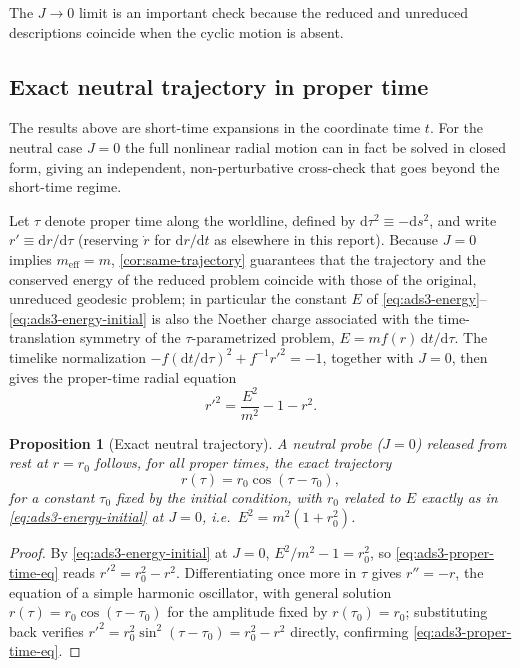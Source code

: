 \documentclass[11pt,a4paper]{article}
\theoremstyle{plain}
\newtheorem{proposition}{Proposition}[section]
\theoremstyle{definition}
\theoremstyle{remark}
\newcommand{\meff}{m_{\mathrm{eff}}}
\begin{document}
The $J\to0$ limit is an important check because the reduced and unreduced descriptions coincide when the cyclic motion is absent.

\subsection{Exact neutral trajectory in proper time}
\label{sec:ads3-exact-neutral}

The results above are short-time expansions in the coordinate time $t$. For the neutral case $J=0$ the full nonlinear radial motion can in fact be solved in closed form, giving an independent, non-perturbative cross-check that goes beyond the short-time regime.

Let $\tau$ denote proper time along the worldline, defined by $\mathrm d\tau^2\equiv-\mathrm ds^2$, and write $r'\equiv\mathrm dr/\mathrm d\tau$ (reserving $\dot r$ for $\mathrm dr/\mathrm dt$ as elsewhere in this report). Because $J=0$ implies $\meff=m$, \cref{cor:same-trajectory} guarantees that the trajectory and the conserved energy of the reduced problem coincide with those of the original, unreduced geodesic problem; in particular the constant $E$ of \eqref{eq:ads3-energy}--\eqref{eq:ads3-energy-initial} is also the Noether charge associated with the time-translation symmetry of the $\tau$-parametrized problem, $E=mf(r)\,\mathrm dt/\mathrm d\tau$. The timelike normalization $-f(\mathrm dt/\mathrm d\tau)^2+f^{-1}r'^2=-1$, together with $J=0$, then gives the proper-time radial equation
\begin{equation}
r'^2=\frac{E^2}{m^2}-1-r^2.
\label{eq:ads3-proper-time-eq}
\end{equation}

\begin{proposition}[Exact neutral trajectory]
\label{prop:ads3-exact-neutral}
A neutral probe ($J=0$) released from rest at $r=r_0$ follows, for all proper times, the exact trajectory
\begin{equation}
\boxed{
r(\tau)=r_0\cos(\tau-\tau_0),
}
\label{eq:ads3-exact-neutral}
\end{equation}
for a constant $\tau_0$ fixed by the initial condition, with $r_0$ related to $E$ exactly as in \eqref{eq:ads3-energy-initial} at $J=0$, i.e.\ $E^2=m^2(1+r_0^2)$.
\end{proposition}

\begin{proof}
By \eqref{eq:ads3-energy-initial} at $J=0$, $E^2/m^2-1=r_0^2$, so \eqref{eq:ads3-proper-time-eq} reads $r'^2=r_0^2-r^2$. Differentiating once more in $\tau$ gives $r''=-r$, the equation of a simple harmonic oscillator, with general solution $r(\tau)=r_0\cos(\tau-\tau_0)$ for the amplitude fixed by $r(\tau_0)=r_0$; substituting back verifies $r'^2=r_0^2\sin^2(\tau-\tau_0)=r_0^2-r^2$ directly, confirming \eqref{eq:ads3-proper-time-eq}.
\end{proof}
\end{document}
